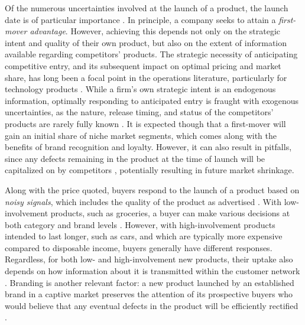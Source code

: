 \documentclass[a4paper,fleqn, 11pt]{cas-sc}
\begin{document}
Of the numerous uncertainties involved at the launch of a product, the launch date is of particular importance \citep{hultink1997industrial, harris1967new}. In principle, a company seeks to attain a \textit{first-mover advantage}. However, achieving this depends not only on the strategic intent and quality of their own product, but also on the extent of information available regarding competitors’ products. 
The strategic necessity of anticipating competitive entry, and its subsequent impact on optimal pricing and market share, has long been a focal point in the operations literature, particularly for technology products \citep{mesak1990impact}. While a firm's own strategic intent is an endogenous information, optimally responding to anticipated entry is fraught with exogenous uncertainties, as the nature, release timing, and status of the competitors' products are rarely fully known \citep{POULSEN2007129}. 
It is expected though that a first-mover will gain an initial share of niche market segments, which comes along with the benefits of brand recognition and loyalty. However, it can also result in pitfalls, since any defects remaining in the product at the time of launch  will be capitalized on by competitors \citep{WU2019138}, potentially resulting in future market shrinkage.


Along with the price quoted, buyers respond to the launch of a product based on  {\em noisy signals}, which includes the quality of the product as advertised \citep{erdem1996decision}. With low-involvement products, such as groceries, a buyer can make various decisions at both category and brand levels \citep{miyazaki2021dynamic}. %
However, with high-involvement products intended to last longer, such as cars, and which are typically more expensive   compared to disposable income, buyers generally have different responses. Regardless, for both low- and high-involvement new products, their uptake also depends on how information about it is transmitted within the customer network \citep{sunar2019optimal}. %
     Branding is another relevant factor: a new product launched by an established brand in a captive market preserves the attention of its prospective buyers who would believe that any eventual defects in the product will be efficiently rectified \citep{wang2025impact, singh2022intertemporal}. 
\end{document}
